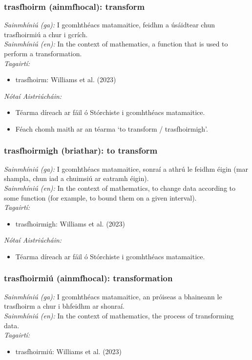 \subsubsection*{trasfhoirm (ainmfhocal): transform}
 \noindent \textit{Sainmhíniú (ga):} I gcomhthéacs matamaitice, feidhm a úsáidtear chun trasfhoirmiú a chur i gcrích.
\\
 \noindent \textit{Sainmhíniú (en):} In the context of mathematics, a function that is used to perform a transformation.
\\
 \noindent \textit{Tagairtí:}
\begin{itemize}
	\item trasfhoirm: Williams et al. (2023) \cite{storchiste}
\end{itemize}

 \noindent \textit{Nótaí Aistriúcháin:}
\begin{itemize}
	\item Téarma díreach ar fáil ó Stórchiste i gcomhthéacs matamaitice.
	\item Féach chomh maith ar an téarma `to transform / trasfhoirmigh'.
\end{itemize}


\subsubsection*{trasfhoirmigh (briathar): to transform}
 \noindent \textit{Sainmhíniú (ga):} I gcomhthéacs matamaitice, sonraí a athrú le feidhm éigin (mar shampla, chun iad a chuimsiú ar eatramh éigin).
\\
 \noindent \textit{Sainmhíniú (en):} In the context of mathematics, to change data according to some function (for example, to bound them on a given interval).
\\
 \noindent \textit{Tagairtí:}
\begin{itemize}
	\item trasfhoirmigh: Williams et al. (2023) \cite{storchiste}
\end{itemize}

 \noindent \textit{Nótaí Aistriúcháin:}
\begin{itemize}
	\item Téarma díreach ar fáil ó Stórchiste i gcomhthéacs matamaitice.
\end{itemize}


\subsubsection*{trasfhoirmiú (ainmfhocal): transformation}
 \noindent \textit{Sainmhíniú (ga):} I gcomhthéacs matamaitice, an próiseas a bhaineann le trasfhoirm a chur i bhfeidhm ar shonraí.
\\
 \noindent \textit{Sainmhíniú (en):} In the context of mathematics, the process of transforming data.
\\
 \noindent \textit{Tagairtí:}
\begin{itemize}
	\item trasfhoirmiú: Williams et al. (2023) \cite{storchiste}
\end{itemize}

